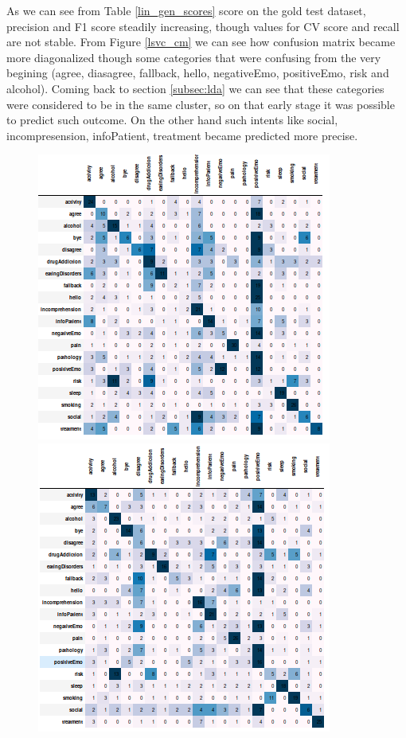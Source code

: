 \documentclass[11pt]{article}
\begin{document}
As we can see from Table \ref{lin_gen_scores} score on the gold test dataset, precision and F1 score steadily increasing, though values for CV score and recall are not stable. 
From Figure \ref{lsvc_cm} we can see how confusion matrix became more diagonalized though some categories that were confusing from the very begining (agree, diasagree, fallback, hello, negativeEmo, positiveEmo, risk and alcohol). Coming back to section \ref{subsec:lda} we can see that these categories were considered to be in the same cluster, so on that early stage it was possible to predict such outcome.
On the other hand such intents like social, incompresension, infoPatient, treatment became predicted more precise. 

\begin{figure}[h]
	\centering
	\includegraphics[scale=0.3]{lsvc_0.png}
	\includegraphics[scale=0.3]{lsvc_1.png}

\end{figure}
\end{document}
